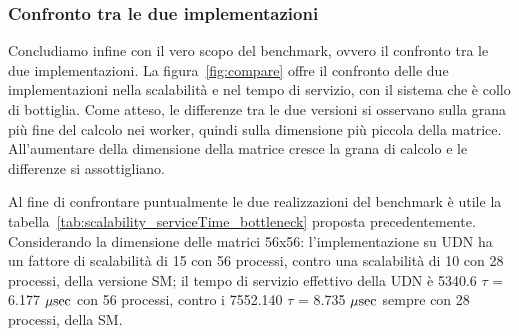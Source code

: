 


\FloatBarrier

\subsubsection*{Confronto tra le due implementazioni}
Concludiamo infine con il vero scopo del benchmark, ovvero il confronto tra le due implementazioni. La figura~\ref{fig:compare} offre il confronto delle due implementazioni nella scalabilit\`a e nel tempo di servizio, con il sistema che \`e collo di bottiglia. Come atteso, le differenze tra le due versioni si osservano sulla grana pi\`u fine del calcolo nei worker, quindi sulla dimensione pi\`u piccola della matrice. All'aumentare della dimensione della matrice cresce la grana di calcolo e le differenze si assottigliano. 

Al fine di confrontare puntualmente le due realizzazioni del benchmark \`e utile la tabella~\ref{tab:scalability_serviceTime_bottleneck} proposta precedentemente. Considerando la dimensione delle matrici 56x56: l'implementazione su UDN ha un fattore di scalabilit\`a di 15 con 56 processi, contro una scalabilit\`a di 10 con 28 processi, della versione SM; il tempo di servizio effettivo della UDN \`e 5340.6 $\tau$ = 6.177 $\mu\mathrm{sec}$ con 56 processi, contro i 7552.140 $\tau$ = 8.735 $\mu\mathrm{sec}$ sempre con 28 processi, della SM. \\

